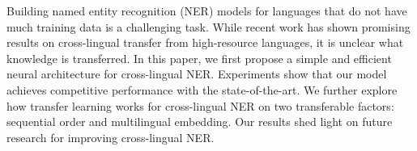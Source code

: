 Building named entity recognition (NER) models for languages that do not have much training data is a challenging task. While recent work has shown promising results on cross-lingual transfer from high-resource languages, it is unclear what knowledge is transferred. In this paper, we first propose a simple and efficient neural architecture for cross-lingual NER. Experiments show that our model achieves competitive performance with the state-of-the-art. We further explore how  transfer learning works for cross-lingual NER on two transferable factors: sequential order and multilingual embedding. Our results shed light on future research for improving cross-lingual NER.